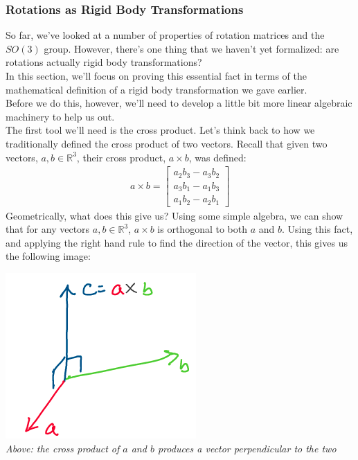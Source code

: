 \documentclass[oneside]{book}
\begin{document}
\subsubsection{Rotations as Rigid Body Transformations}
So far, we've looked at a number of properties of rotation matrices and the $SO(3)$ group. However, there's one thing that we haven't yet formalized: are rotations actually rigid body transformations?\\
In this section, we'll focus on proving this essential fact in terms of the mathematical definition of a rigid body transformation we gave earlier.\\
Before we do this, however, we'll need to develop a little bit more linear algebraic machinery to help us out.\\
The first tool we'll need is the cross product. Let's think back to how we traditionally defined the cross product of two vectors. Recall that given two vectors, $a, b\in \mathbb{R}^3$, their cross product, $a\times b$, was defined:
\begin{align}
    a\times b = 
    \begin{bmatrix}
    a_2b_3 - a_3b_2\\
    a_3b_1 - a_1b_3\\
    a_1b_2 - a_2b_1
    \end{bmatrix}
\end{align}
Geometrically, what does this give us? Using some simple algebra, we can show that for any vectors $a, b\in \mathbb{R}^3$, $a\times b$ is orthogonal to both $a$ and $b$. Using this fact, and applying the right hand rule to find the direction of the vector, this gives us the following image:
\begin{center}
    \includegraphics[scale=0.5]{images/crossprod.png}\\
    \textit{Above: the cross product of $a$ and $b$ produces a vector perpendicular to the two}
\end{center}
\end{document}
